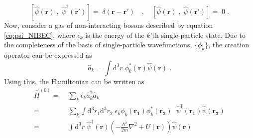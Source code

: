 \begin{equation}
	\left[ \hat{\psi}(\boldsymbol{r}) \; , \; \hat{\psi}^{\dag}(\boldsymbol{r'}) \right] = \; \delta(\boldsymbol{r} - \boldsymbol{r}') \quad , \quad
	\left[ \hat{\psi}(\boldsymbol{r}) \; , \; \hat{\psi}(\boldsymbol{r'}) \right] = \; 0 \; .
\end{equation}
Now, consider a gas of non-interacting bosons described by equation \ref{eq:psi_NIBEC}, where $\epsilon_k$ is the energy of the $k$'th single-particle state. Due to the completeness of the basis of single-particle wavefunctions, $\{ \phi_k \}$, the creation operator can be expressed as
\begin{equation}
	\hat{a}_k = \int \mathrm{d^3} r \;  \phi_{k}^*(\boldsymbol{r}) \hat{\psi}(\boldsymbol{r}) \; .
\end{equation}
Using this, the Hamiltonian can be written as
\begin{align}
	\hat{H}^{(0)} =& \; \sum_{k} \epsilon_k \hat{a}_{k}^{\dag} \hat{a}_{k} \nonumber \\
		=& \;  \sum_{k} \int \mathrm{d^3}r_1 \mathrm{d^3}r_2 \; \epsilon_k \phi_k (\boldsymbol{r_1}) \phi_{k}^* (\boldsymbol{r_2})\; \; \hat{\psi}^{\dag} (\boldsymbol{r_1}) \hat{\psi} (\boldsymbol{r_2}) \nonumber \\
		=& \; \int \mathrm{d^3}r  \; \hat{\psi}^{\dag}(\boldsymbol{r}) \left( - \frac{\hbar^2}{2 m} \nabla^2 + U(\boldsymbol{r})\right) \hat{\psi}(\boldsymbol{r})
		\label{hamil2nd}
\end{align}

